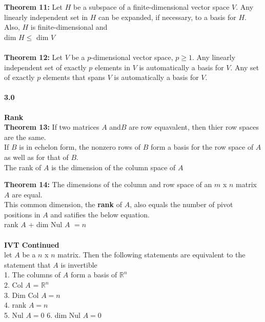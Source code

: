 \documentclass[14pt]{extreport}
\begin{document}
\textbf{Theorem 11: } Let $H$ be a subspace of a finite-dimensional vector space $V$. Any linearly independent set in $H$ can be expanded, if necessary, to a basis for $H$. Also, $H$ is finite-dimensional and\\
dim $H \le$ dim $V$\\\\

\textbf{Theorem 12: }Let $V$ be a $p$-dimensional vector space, $p \ge 1$. Any linearly independent set of exactly $p$ elements in $V$ is automatically a basis for $V$. Any set of exactly $p$ elements that spans $V$ is automatically a basis for $V$.\\

\paragraph{3.0} \textbf{Rank}\\

\textbf{Theorem 13: } If two matrices $A$ and$ B$ are row equavalent, then thier row spaces are the same.\\
If $B$ is in echelon form, the nonzero rows of $B$ form a basis for the row space of $A$ as well as for that of $B$.\\

The rank of $A$ is the dimension of the column space of $A$

\textbf{Theorem 14: } The dimensions of the column and row space of an $m$ x $n$ matrix $A$ are equal.\\
This common dimension, the \textbf{rank} of $A$, also equals the number of pivot positions in $A$ and satifies the below equation.\\

rank $A$ + dim Nul $A$ $= n$\\\\

\textbf{IVT Continued}\\

let $A$ be a $n$ x $n$ matrix. Then the following statements are equivalent to the statement that
$A$ is invertible\\

1. The columns of $A$ form a basis of $\mathbb{R}^n$\\
2. Col $A$ = $\mathbb{R}^n$\\
3. Dim Col $A = n$\\
4. rank $A = n$\\
5. Nul $A = {0}$
6. dim Nul $A = 0$\\
\end{document}
